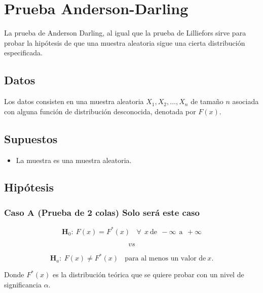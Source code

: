 \documentclass[
  a4paper,
  oneside,
  openany]{book}
\providecommand{\tightlist}{%
  \setlength{\itemsep}{0pt}\setlength{\parskip}{0pt}}
\begin{document}
\hypertarget{prueba-anderson-darling}{%
\chapter{Prueba Anderson-Darling}\label{prueba-anderson-darling}}

La prueba de Anderson Darling, al igual que la prueba de Lilliefors sirve para probar la
hipótesis de que una muestra aleatoria sigue una cierta distribución especificada.

\hypertarget{datos-18}{%
\section{Datos}\label{datos-18}}

Los datos consisten en una muestra aleatoria \(X_{1},X_{2},\ldots,X_{n}\) de tamaño \(n\) asociada con alguna función de distribución desconocida, denotada por \(F(x)\).

\hypertarget{supuestos-16}{%
\section{Supuestos}\label{supuestos-16}}

\begin{itemize}
\tightlist
\item
  La muestra es una muestra aleatoria.
\end{itemize}

\hypertarget{hipuxf3tesis-18}{%
\section{Hipótesis}\label{hipuxf3tesis-18}}

\hypertarget{caso-a-prueba-de-2-colas-solo-seruxe1-este-caso}{%
\subsection*{Caso A (Prueba de 2 colas) Solo será este caso}\label{caso-a-prueba-de-2-colas-solo-seruxe1-este-caso}}


\[\textbf{H}_0: \ F(x)=F^*(x) \ \ \ \ \forall\ \ x\  \mbox{de} \ \ -\infty \ \ \mbox{a} \ \  +\infty\]

\[vs\]

\[\textbf{H}_a: \ F(x) \neq F^*(x) \ \ \ \ \mbox{para al menos un  valor de} \  x.\]

Donde \(F^*(x)\) es la distribución teórica que se quiere probar con un nivel de significancia \(\alpha\).
\end{document}
